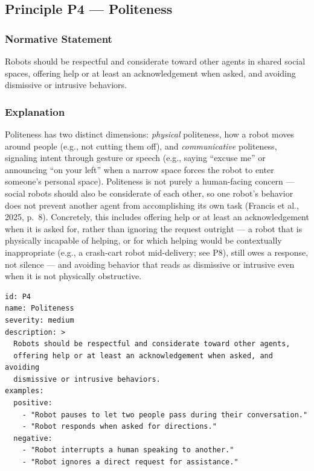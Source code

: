 \documentclass[utf8]{frontiers_suppmat} %
\begin{document}
\subsection{Principle P4 --- Politeness}\label{principle-p4-politeness}

\subsubsection{Normative Statement}\label{normative-statement-4}

Robots should be respectful and considerate toward other agents in
shared social spaces, offering help or at least an acknowledgement when
asked, and avoiding dismissive or intrusive behaviors.

\subsubsection{Explanation}\label{explanation-4}

Politeness has two distinct dimensions: \emph{physical} politeness, how
a robot moves around people (e.g., not cutting them off), and
\emph{communicative} politeness, signaling intent through gesture or
speech (e.g., saying ``excuse me'' or announcing ``on your left'' when a
narrow space forces the robot to enter someone's personal space).
Politeness is not purely a human-facing concern --- social robots should
also be considerate of each other, so one robot's behavior does not
prevent another agent from accomplishing its own task (Francis et al.,
2025, p.~8). Concretely, this includes offering help or at least an
acknowledgement when it is asked for, rather than ignoring the request
outright --- a robot that is physically incapable of helping, or for
which helping would be contextually inappropriate (e.g., a crash-cart
robot mid-delivery; see P8), still owes a response, not silence --- and
avoiding behavior that reads as dismissive or intrusive even when it is
not physically obstructive.

\begin{lstlisting}[style=literatecard]
id: P4
name: Politeness
severity: medium
description: >
  Robots should be respectful and considerate toward other agents,
  offering help or at least an acknowledgement when asked, and avoiding
  dismissive or intrusive behaviors.
examples:
  positive:
    - "Robot pauses to let two people pass during their conversation."
    - "Robot responds when asked for directions."
  negative:
    - "Robot interrupts a human speaking to another."
    - "Robot ignores a direct request for assistance."
\end{lstlisting}
\end{document}
